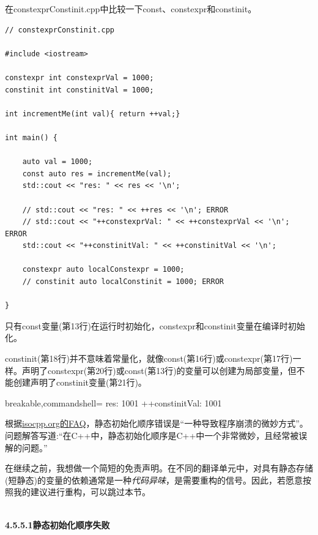 
在constexprConstinit.cpp中比较一下const、constexpr和constinit。

\begin{lstlisting}[style=styleCXX]
// constexprConstinit.cpp

#include <iostream>

constexpr int constexprVal = 1000;
constinit int constinitVal = 1000;

int incrementMe(int val){ return ++val;}

int main() {
	
	auto val = 1000;
	const auto res = incrementMe(val);
	std::cout << "res: " << res << '\n';
	
	// std::cout << "res: " << ++res << '\n'; ERROR
	// std::cout << "++constexprVal: " << ++constexprVal << '\n'; ERROR
	std::cout << "++constinitVal: " << ++constinitVal << '\n';
	
	constexpr auto localConstexpr = 1000;
	// constinit auto localConstinit = 1000; ERROR

}
\end{lstlisting}

只有const变量(第13行)在运行时初始化，constexpr和constinit变量在编译时初始化。

constinit(第18行)并不意味着常量化，就像const(第16行)或constexpr(第17行)一样。声明了constexpr(第20行)或const(第13行)的变量可以创建为局部变量，但不能创建声明了constinit变量(第21行)。

\begin{tcblisting}{breakable,commandshell={}}
res: 1001
++constinitVal: 1001
\end{tcblisting}


根据\href{https://isocpp.org/wiki/faq/ctors#static-init-order}{isocpp.org的FAQ}，静态初始化顺序错误是“一种导致程序崩溃的微妙方式”。问题解答写道:“在C++中，静态初始化顺序是C++中一个非常微妙，且经常被误解的问题。”

在继续之前，我想做一个简短的免责声明。在不同的翻译单元中，对具有静态存储(短静态)的变量的依赖通常是一种\textit{代码异味}，是需要重构的信号。因此，若愿意按照我的建议进行重构，可以跳过本节。

\hspace*{\fill} \\ %
\noindent
\textbf{4.5.5.1\hspace{0.2cm}静态初始化顺序失败}

